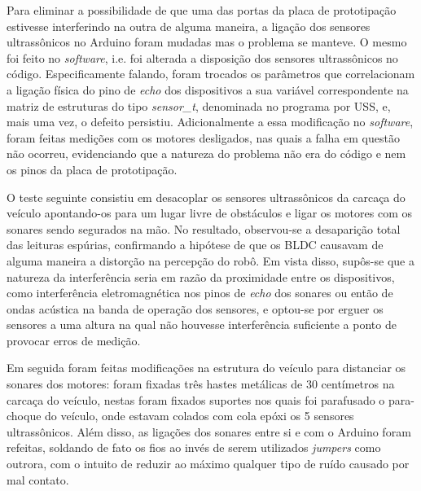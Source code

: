 Para eliminar a possibilidade de que uma das portas da placa de prototipação estivesse interferindo na outra de alguma maneira, a 
ligação dos sensores ultrassônicos no Arduino foram mudadas mas o problema se manteve.
O mesmo foi feito no \textit{software}, i.e. foi alterada a disposição dos sensores ultrassônicos no código. 
Especificamente falando, foram trocados os parâmetros que correlacionam a ligação física do pino de \textit{echo} dos dispositivos a sua variável 
correspondente na matriz de estruturas do tipo \textit{sensor\_t}, denominada no programa por USS, e, mais uma vez, o defeito persistiu.
Adicionalmente a essa modificação no \textit{software}, foram feitas medições com os motores desligados, nas quais a falha em questão não ocorreu, 
evidenciando que a natureza do problema não era do código e nem os pinos da placa de prototipação.

O teste seguinte consistiu em desacoplar os sensores ultrassônicos da carcaça do veículo apontando-os para um lugar livre de obstáculos e ligar os 
motores com os sonares sendo segurados na mão. 
No resultado, observou-se a desaparição total das leituras espúrias, confirmando a hipótese de que os BLDC causavam de alguma maneira a distorção na 
percepção do robô.
Em vista disso, supôs-se que a natureza da interferência seria em razão da proximidade entre os dispositivos, como interferência eletromagnética nos 
pinos de \textit{echo} dos sonares ou então de ondas acústica na banda de operação dos sensores, e optou-se por erguer os sensores a uma altura 
na qual não houvesse interferência suficiente a ponto de provocar erros de medição.

Em seguida foram feitas modificações na estrutura do veículo para distanciar os sonares dos motores: foram fixadas três hastes metálicas de 30 
centímetros na carcaça do veículo, nestas foram fixados suportes nos quais foi parafusado o para-choque do veículo, onde estavam colados com 
cola epóxi os 5 sensores ultrassônicos. Além disso, as ligações dos sonares entre si e com o Arduino foram refeitas, soldando de fato os fios ao 
invés de serem utilizados \textit{jumpers} como outrora, com o intuito de reduzir ao máximo qualquer tipo de ruído causado por mal contato.

